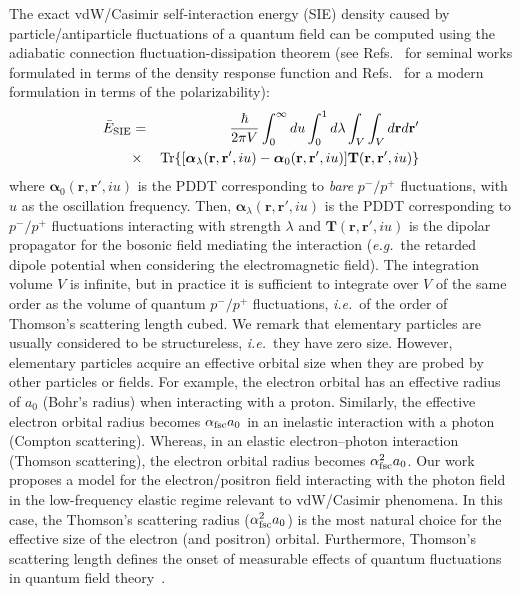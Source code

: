 \documentclass[aps,prl,twocolumn,showpacs,groupaddress]{revtex4-1}
\newcommand{\rrr}[1]{{\color{black}#1}}
\newcommand{\bbb}[1]{{\color{black}#1}}
\begin{document}
The exact vdW/Casimir self-interaction energy (SIE) density caused by particle/antiparticle fluctuations of a quantum field can be computed using the adiabatic connection fluctuation-dissipation theorem (see Refs.~\cite{ACFDT1,ACFDT2} for seminal works formulated in terms of the density response function and Refs.~\cite{Jan-ChemRev,Woods-RMP,AR-AT-PRL} for a modern formulation in terms of the polarizability):
\begin{eqnarray}
\label{eqExact}
\bar{E}_{\rm SIE} &=& \frac{\hbar}{2\pi V} \int_0^{\infty} du \int_0^1 d\lambda \int_{V}\int_{V} d\mathbf{r} d\mathbf{r}' \nonumber \\
&\times& \mathrm{Tr}\{[{\bm{\alpha}}_{\lambda}(\mathbf{r},\mathbf{r}',iu)-{\bm{\alpha}}_0(\mathbf{r},\mathbf{r}',iu)] \mathbf{T}(\mathbf{r},\mathbf{r}',iu)\}
\end{eqnarray}
where ${\bm{\alpha}}_0(\mathbf{r},\mathbf{r}',iu)$ is the PDDT corresponding to \emph{bare} $p^-/p^+$ fluctuations, with $u$ as the oscillation frequency. Then, ${\bm{\alpha}}_{\lambda}(\mathbf{r},\mathbf{r}',iu)$ is the PDDT corresponding to $p^-/p^+$ fluctuations interacting with strength $\lambda$ and $\mathbf{T}(\mathbf{r},\mathbf{r}',iu)$ is the dipolar propagator for the bosonic field mediating the interaction (\emph{e.g.}~the retarded dipole potential when considering the electromagnetic field). The integration volume $V$ is infinite, but in practice it is sufficient to integrate over $V$ of the same order as the volume of quantum $p^-/p^+$  
fluctuations, \emph{i.e.}~of the order of Thomson's scattering 
length cubed.
\bbb{We remark that elementary particles are usually considered to be structureless, \emph{i.e.}~they have zero size. However, elementary particles acquire an effective orbital size when they are probed by other particles or fields. For example, the electron orbital has an effective radius of $a_0$ (Bohr's radius) when interacting with a proton. Similarly, the effective electron orbital radius becomes $\alpha_{\rm fsc} a_0$ in an inelastic interaction with a photon \rrr{(Compton scattering)}. Whereas, in an elastic electron--photon interaction \rrr{(Thomson scattering)}, the electron orbital radius becomes $\alpha_{\rm fsc}^2 a_0$. Our work proposes a model for the electron/positron field interacting with the photon field in the low-frequency elastic regime relevant to vdW/Casimir phenomena. In this case, the Thomson's scattering radius ($\alpha_{\rm fsc}^2 a_0$) is the most natural choice for the effective size of the electron (and positron) orbital. Furthermore, Thomson's scattering length defines the onset of measurable effects of quantum fluctuations in quantum field theory~\cite{Milonni-book}.}
\end{document}
